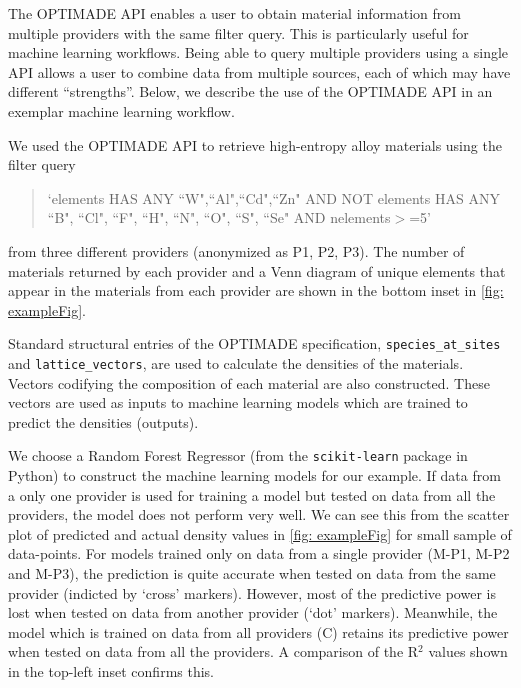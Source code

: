 \documentclass{article}
\begin{document}
	The OPTIMADE API enables a user to obtain material information from multiple providers with the same filter query. This is particularly useful for machine learning workflows. Being able to query multiple providers using a single API allows a user to combine data from multiple sources, each of which may have different ``strengths''. Below, we describe the use of the OPTIMADE API in an exemplar machine learning workflow.
	
	We used the OPTIMADE API to retrieve high-entropy alloy materials using the filter query 
	\begin{quote}
		`elements HAS ANY ``W",``Al",``Cd",``Zn" AND NOT elements HAS ANY ``B", ``Cl", ``F", ``H", ``N", ``O", ``S", ``Se" AND nelements$>$=5'		
	\end{quote}
	from three different providers (anonymized as P1, P2, P3). The number of materials returned by each provider and a Venn diagram of unique elements that appear in the materials from each provider are shown in the bottom inset in \autoref{fig: exampleFig}.

	Standard structural entries of the OPTIMADE specification, \verb|species_at_sites| and \verb|lattice_vectors|, are used to calculate the densities of the materials. Vectors codifying the composition of each material are also constructed. These vectors are used as inputs to machine learning models which are trained to predict the densities (outputs).
	
	We choose a Random Forest Regressor (from the \verb|scikit-learn| package in Python) to construct the machine learning models for our example. If data from a only one provider is used for training a model but tested on data from all the providers, the model does not perform very well. We can see this from the scatter plot of predicted and actual density values in \autoref{fig: exampleFig} for small sample of data-points. For models trained only on data from a single provider (M-P1, M-P2 and M-P3), the prediction is quite accurate when tested on data from the same provider (indicted by `cross' markers). However, most of the predictive power is lost when tested on data from another provider (`dot' markers). Meanwhile, the model which is trained on data from all providers (C) retains its predictive power when tested on data from all the providers. A comparison of the R$^2$ values shown in the top-left inset confirms this.
	
\end{document}
